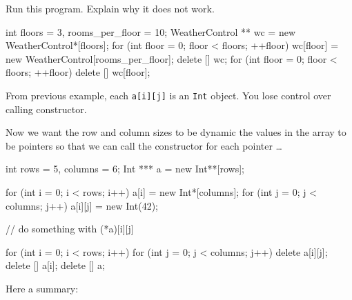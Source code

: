 \begin{ex}Run this program. Explain why it does not work.
\begin{console}
int floors = 3, rooms_per_floor = 10;
WeatherControl ** wc = new WeatherControl*[floors];
for (int floor = 0; floor < floors; ++floor)
{   
    wc[floor] = new WeatherControl[rooms_per_floor];
}
delete [] wc;
for (int floor = 0; floor < floors; ++floor)
{   
    delete [] wc[floor];
}
\end{console}
From previous example, each \texttt{a[i][j]} is an \texttt{Int}
object. You lose control over calling constructor.
\end{ex}
Now we want the row and column sizes to be dynamic  the values in the array to be pointers so that we can call the constructor for each pointer \ldots

\begin{consolethree}[escapeinside=||]%
int rows = 5, columns = 6;
Int *** a = new Int**[rows];

for (int i = 0; i < rows; i++)
{   
    a[i] = new Int*[columns];
    for (int j = 0; j < columns; j++)
        a[i][j] = new Int(42);
}

// do something with (*a)[i][j]

for (int i = 0; i < rows; i++)
{   
    for (int j = 0; j < columns; j++)
    delete a[i][j];
    delete [] a[i];
}           
delete [] a;
\end{consolethree}

Here a summary:

